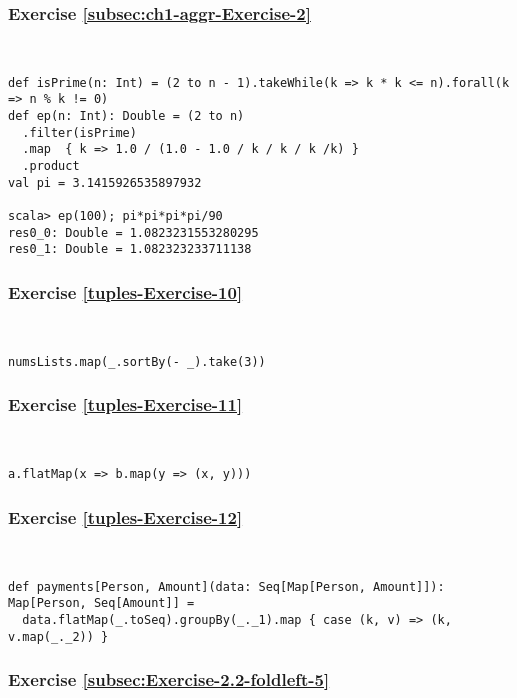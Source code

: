 \subsubsection*{Exercise \ref{subsec:ch1-aggr-Exercise-2}}

~
\begin{lstlisting}
def isPrime(n: Int) = (2 to n - 1).takeWhile(k => k * k <= n).forall(k => n % k != 0)
def ep(n: Int): Double = (2 to n)
  .filter(isPrime)
  .map  { k => 1.0 / (1.0 - 1.0 / k / k / k /k) }
  .product
val pi = 3.1415926535897932

scala> ep(100); pi*pi*pi*pi/90
res0_0: Double = 1.0823231553280295
res0_1: Double = 1.082323233711138 
\end{lstlisting}



\subsubsection*{Exercise \ref{tuples-Exercise-10}}

~
\begin{lstlisting}
numsLists.map(_.sortBy(- _).take(3))
\end{lstlisting}


\subsubsection*{Exercise \ref{tuples-Exercise-11}}

~
\begin{lstlisting}
a.flatMap(x => b.map(y => (x, y)))
\end{lstlisting}


\subsubsection*{Exercise \ref{tuples-Exercise-12}}

~
\begin{lstlisting}
def payments[Person, Amount](data: Seq[Map[Person, Amount]]): Map[Person, Seq[Amount]] =
  data.flatMap(_.toSeq).groupBy(_._1).map { case (k, v) => (k, v.map(_._2)) }
\end{lstlisting}


\subsubsection*{Exercise \ref{subsec:Exercise-2.2-foldleft-5}}

